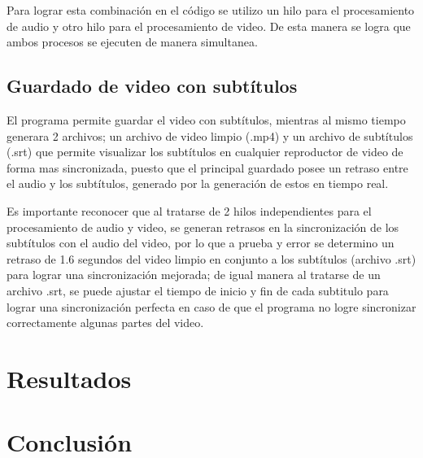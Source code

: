 \documentclass[conference]{IEEEtran}
\begin{document}
Para lograr esta combinación en el código se utilizo un hilo para el procesamiento de audio y otro hilo para el procesamiento de video. De esta manera se logra que ambos procesos se ejecuten de manera simultanea. 

\subsection{Guardado de video con subtítulos}
El programa permite guardar el video con subtítulos, mientras al mismo tiempo generara 2 archivos; un archivo de video limpio (.mp4) y un archivo de subtítulos (.srt) que permite visualizar los subtítulos en cualquier reproductor de video de forma mas sincronizada, puesto que el principal guardado posee un retraso entre el audio y los subtítulos, generado por la generación de estos en tiempo real.

Es importante reconocer que al tratarse de 2 hilos independientes para el procesamiento de audio y video, se generan retrasos en la sincronización de los subtítulos con el audio del video, por lo que a prueba y error se determino un retraso de 1.6 segundos del video limpio en conjunto a los subtítulos (archivo .srt) para lograr una sincronización mejorada; de igual manera al tratarse de un archivo .srt, se puede ajustar el tiempo de inicio y fin de cada subtitulo para lograr una sincronización perfecta en caso de que el programa no logre sincronizar correctamente algunas partes del video.


\section{Resultados}


\section{Conclusión}


\nocite{calcularRangos}
\printbibliography
\end{document}
